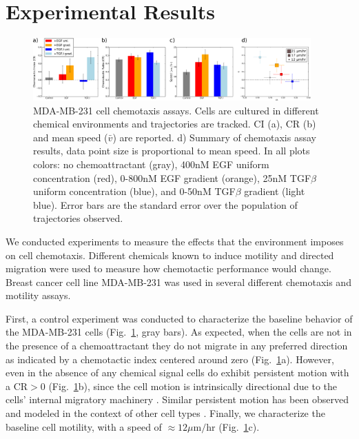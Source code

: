 \section{Experimental Results}

\begin{figure}
    \centering
    \includegraphics[width=0.95\textwidth]{../fig/ch2_fig2.png}
    \caption{ MDA-MB-231 cell chemotaxis assays. Cells are cultured in different chemical environments and trajectories are tracked. CI (a), CR (b) and mean speed ($\bar{v}$) are reported. d) Summary of chemotaxis assay results, data point size is proportional to mean speed. In all plots colors: no chemoattractant (gray), 400nM EGF uniform concentration (red), 0-800nM EGF gradient (orange), 25nM TGF$\beta$ uniform concentration (blue), and 0-50nM TGF$\beta$ gradient (light blue). Error bars are the standard error over the population of trajectories observed.} \label{fig:ch2_2}
\end{figure}

We conducted experiments to measure the effects that the environment imposes on cell chemotaxis. Different chemicals known to induce motility and directed migration were used to measure how chemotactic performance would change. Breast cancer cell line MDA-MB-231 was used in several different chemotaxis and motility assays.


First, a control experiment was conducted to characterize the baseline behavior of the MDA-MB-231 cells (Fig.\ \ref{fig:ch2_2}, gray bars). As expected, when the cells are not in the presence of a chemoattractant they do not migrate in any preferred direction as indicated by a chemotactic index centered around zero (Fig.\ \ref{fig:ch2_2}a). However, even in the absence of any chemical signal cells do exhibit persistent motion with a $\text{CR} > 0$ (Fig.\ \ref{fig:ch2_2}b), since the cell motion is intrinsically directional due to the cells' internal migratory machinery \cite{petrie2009random}.
Similar persistent motion has been observed and modeled in the context of other cell types \cite{kim2013cooperative,codling2008random,othmer1988models}. Finally, we characterize the baseline cell motility, with a speed of $\approx 12 \mu\text{m/hr}$ (Fig.\ \ref{fig:ch2_2}c).

